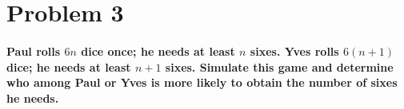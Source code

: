 \documentclass[12pt,letterpaper]{article}
\begin{document}

    \section*{Problem 3}
       
    \paragraph*{Paul rolls $6n$ dice once; he needs at least $n$ sixes. Yves rolls $6(n + 1)$ dice; he needs at least $n + 1$ sixes. Simulate this game and determine who among Paul or Yves is more likely to obtain the number of sixes he needs.}
    \hspace*{1cm}
    \vspace*{0.5cm}
\end{document}
